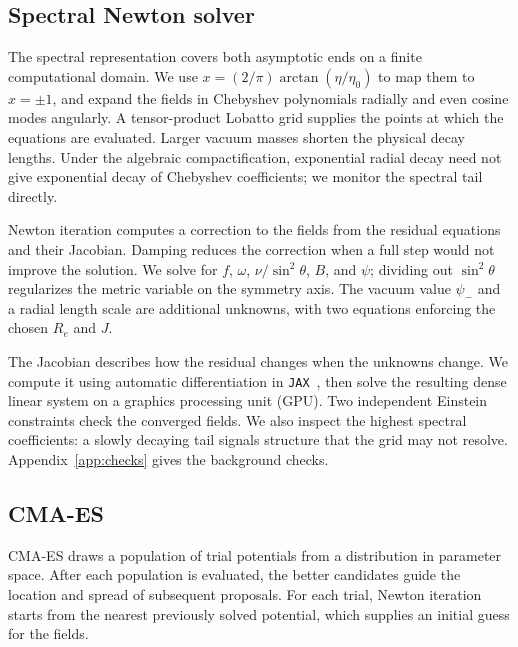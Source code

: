 \documentclass[twocolumn,floatfix,aps,prd,superscriptaddress,nofootinbib]{revtex4-2}
\begin{document}
\subsection{Spectral Newton solver}
\label{sec:opt:solver}

The spectral representation covers both asymptotic ends on a finite computational domain. We use $x=(2/\pi)\arctan(\eta/\eta_0)$ to map them to $x=\pm1$, and expand the fields in Chebyshev polynomials radially and even cosine modes angularly. A tensor-product Lobatto grid supplies the points at which the equations are evaluated.
Larger vacuum masses shorten the physical decay lengths. Under the algebraic
compactification, exponential radial decay need not give exponential decay
of Chebyshev coefficients; we monitor the spectral tail directly.

Newton iteration computes a correction to the fields from the residual equations and their Jacobian. Damping reduces the correction when a full step would not improve the solution. We solve for $f$, $\omega$, $\nu/\sin^2\theta$, $B$, and $\psi$; dividing out $\sin^2\theta$ regularizes the metric variable on the symmetry axis. The vacuum value $\psi_-$ and a radial length scale are additional unknowns, with two equations enforcing the chosen $R_e$ and $J$.

The Jacobian describes how the residual changes when the unknowns change. We compute it using automatic differentiation in \texttt{JAX}~\cite{jax2018}, then solve the resulting dense linear system on a graphics processing unit (GPU). Two independent Einstein constraints check the converged fields. We also inspect the highest spectral coefficients: a slowly decaying tail signals structure that the grid may not resolve. Appendix~\ref{app:checks} gives the background checks.

\subsection{CMA-ES}
\label{sec:opt:cma}

CMA-ES draws a population of trial potentials from a distribution in parameter space. After each population is evaluated, the better candidates guide the location and spread of subsequent proposals. For each trial, Newton iteration starts from the nearest previously solved potential, which supplies an initial guess for the fields.
\end{document}
